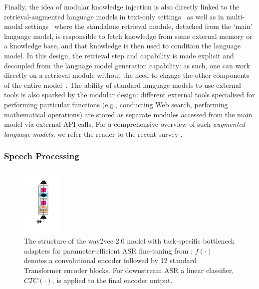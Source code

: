 \documentclass[10pt]{article} %
\begin{document}
Finally, the idea of modular knowledge injection is also directly linked to the retrieval-augmented language models in text-only settings~ \citep{Lewis:2020rag} as well as in multi-modal settings~\citep{Yasunaga:2023arxiv} where the standalone retrieval module, detached from the `main' language model, is responsible to fetch knowledge from some external memory or a knowledge base, and that knowledge is then used to condition the language model. In this design, the retrieval step and capability is made explicit and decoupled from the language model generation capability: as such, one can work directly on a retrieval module without the need to change the other components of the entire model~\citep{yu-etal-2023-augmentation}. The ability of standard language models to use external tools is also sparked by the modular design: different external tools specialised for performing particular functions (e.g., conducting Web search, performing mathematical operations) are stored as separate modules accessed from the main model via external API calls. For a comprehensive overview of such \textit{augmented language models}, we refer the reader to the recent survey \cite{auglms:2023}. 

 


\subsubsection{Speech Processing}
\label{ss:speech}

\begin{figure}
  \begin{center}
    \includegraphics[width=0.17\textwidth]{img/wav2vec.pdf}
  \end{center}
  \caption{The structure of the wav2vec 2.0 model with task-specific bottleneck adapters for parameter-efficient ASR fine-tuning from \citet{Thomas:2022speech}; 
  $f(\cdot)$ denotes a convolutional encoder followed by 12 standard Transformer encoder blocks. For downstream ASR a linear classifier, $CTC(\cdot)$, is applied to the final encoder output.}
   \label{fig:app_speech}
\end{figure}
\end{document}
